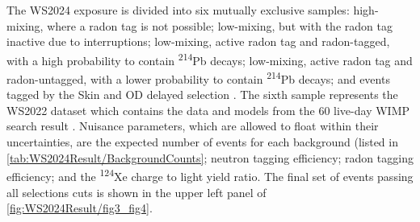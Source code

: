 The WS2024 exposure is divided into six mutually exclusive samples: high-mixing, where a radon tag is not possible; low-mixing, but with the radon tag inactive due to interruptions; low-mixing, active radon tag and radon-tagged, with a high probability to contain \textsuperscript{214}Pb decays; low-mixing, active radon tag and radon-untagged, with a lower probability to contain \textsuperscript{214}Pb decays; and events tagged by the Skin and OD delayed selection \cite{LZCollaboration:2024lux}. The sixth sample represents the WS2022 dataset which contains the data and models from the 60 live-day WIMP search result \cite{LZ:2022lsv}. Nuisance parameters, which are allowed to float within their uncertainties, are the expected number of events for each background (listed in \autoref{tab:WS2024Result/BackgroundCounts}; neutron tagging efficiency; radon tagging efficiency; and the \textsuperscript{124}Xe charge to light yield ratio. The final set of events passing all selections cuts is shown in the upper left panel of \autoref{fig:WS2024Result/fig3_fig4}.


